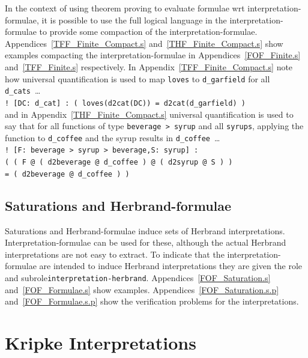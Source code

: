 \documentclass{easychair}
\newcommand{\smalltt}[1]{\small \texttt{#1}}
\begin{document}
In the context of using theorem proving to evaluate formulae wrt interpretation-formulae, it is 
possible to use the full logical language in the interpretation-formulae to provide some 
compaction of the interpretation-formulae.
Appendices~\ref{TFF_Finite_Compact.s} and~\ref{THF_Finite_Compact.s} show examples compacting the
interpretation-formulae in Appendices~\ref{FOF_Finite.s} and~\ref{TFF_Finite.s} respectively.
In Appendix~\ref{TFF_Finite_Compact.s} note how universal quantification is used to map
{\tt loves} to {\tt d\_garfield} for all {\tt d\_cats}~\ldots \\
\hspace*{0.5cm}\smalltt{! [DC: d\_cat] : ( loves(d2cat(DC)) = d2cat(d\_garfield) )} \\
and in Appendix~\ref{THF_Finite_Compact.s} universal quantification is used to say that for all
functions of type {\tt beverage > syrup} and all {\tt syrups}, applying the function to
{\tt d\_coffee} and the syrup results in {\tt d\_coffee}~\ldots \\
\hspace*{0.5cm}\smalltt{! [F: beverage > syrup > beverage,S: syrup] :} \\
\hspace*{0.8cm}\smalltt{( ( F @ ( d2beverage @ d\_coffee ) @ ( d2syrup @ S ) )} \\
\hspace*{0.8cm}\smalltt{= ( d2beverage @ d\_coffee ) )}

\subsection{Saturations and Herbrand-formulae}
\label{NewHerbrand}

Saturations and Herbrand-formulae induce sets of Herbrand interpretations.
Interpretation-formulae can be used for these, although the actual Herbrand interpretations are
not easy to extract.
To indicate that the interpretation-formulae are intended to induce Herbrand interpretations they
are given the role and subrole{\tt interpretation-herbrand}.
Appendices~\ref{FOF_Saturation.s} and~\ref{FOF_Formulae.s} show examples.
Appendices~\ref{FOF_Saturation.s.p} and~\ref{FOF_Formulae.s.p} show the verification problems for 
the interpretations.

\section{Kripke Interpretations}
\label{NewKripke}
 
\end{document}
